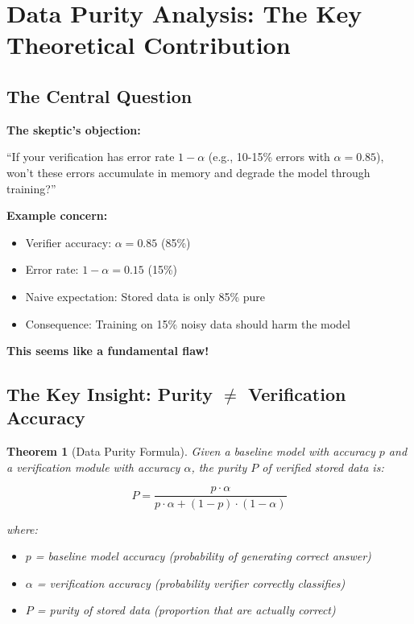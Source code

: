 \documentclass[12pt,a4paper]{article}
\newtheorem{theorem}{Theorem}[section]
\theoremstyle{definition}
\begin{document}
\newpage

\section{Data Purity Analysis: The Key Theoretical Contribution}

\subsection{The Central Question}

\begin{problembox}
\textbf{The skeptic's objection:}

``If your verification has error rate $1-\alpha$ (e.g., 10-15\% errors with $\alpha=0.85$), won't these errors accumulate in memory and degrade the model through training?''

\textbf{Example concern:}
\begin{itemize}
    \item Verifier accuracy: $\alpha = 0.85$ (85\%)
    \item Error rate: $1-\alpha = 0.15$ (15\%)
    \item Naive expectation: Stored data is only 85\% pure
    \item Consequence: Training on 15\% noisy data should harm the model
\end{itemize}

\textbf{This seems like a fundamental flaw!}
\end{problembox}

\subsection{The Key Insight: Purity $\neq$ Verification Accuracy}

\begin{theorem}[Data Purity Formula]
\label{thm:purity}
Given a baseline model with accuracy $p$ and a verification module with accuracy $\alpha$, the purity $P$ of verified stored data is:

\begin{equation}
P = \frac{p \cdot \alpha}{p \cdot \alpha + (1-p) \cdot (1-\alpha)}
\end{equation}

where:
\begin{itemize}
    \item $p$ = baseline model accuracy (probability of generating correct answer)
    \item $\alpha$ = verification accuracy (probability verifier correctly classifies)
    \item $P$ = purity of stored data (proportion that are actually correct)
\end{itemize}
\end{theorem}
\end{document}
